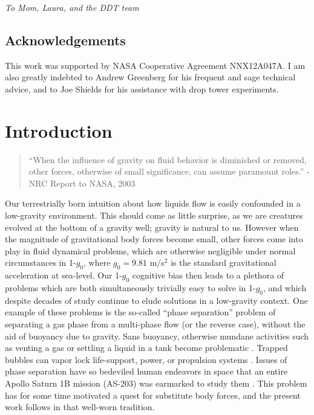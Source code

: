 \documentclass[12pt,a4paper,oneside]{book}
\newcommand\blankpage{%
    \null
    \thispagestyle{empty}%
    \addtocounter{page}{-1}%
    \newpage}
\begin{document}
\emph{To Mom, Laura, and the DDT team}\\
\vspace*{\fill}

\clearpage


\vspace*{\fill}
\section*{Acknowledgements}

This work was supported by NASA Cooperative Agreement NNX12A047A. I am also greatly indebted to Andrew Greenberg for his frequent and sage technical advice, and to Joe Shields for his assistance with drop tower experiments. \\ 
\vspace*{\fill}
\clearpage

\tableofcontents
\listoffigures

\mainmatter
\chapter{Introduction}
\begin{quote}
``When the influence of gravity on fluid behavior is diminished or removed, other forces, otherwise of small significance, can assume paramount roles.''
- NRC Report to NASA, 2003 \cite{motil_priorities_2012}
\end{quote}

Our terrestrially born intuition about how liquids flow is easily confounded in a low-gravity environment. This should come as little surprise, as we are creatures evolved at the bottom of a gravity well; gravity is natural to us. However when the magnitude of gravitational body forces become small, other forces come into play in fluid dynamical problems, which are otherwise negligible under normal circumstances in 1-$g_0$, where $g_0=9.81$ m/s$^2$ is the standard gravitational acceleration at sea-level. Our 1-$g_0$ cognitive bias then leads to a plethora of problems which are both simultaneously trivially easy to solve in 1-$g_0$, and which despite decades of study continue to elude solutions in a low-gravity context. One example of these problems is the so-called ``phase separation'' problem of separating a gas phase from a multi-phase flow (or the reverse case), without the aid of buoyancy due to gravity. Sans buoyancy, otherwise mundane activities such as venting a gas or settling a liquid in a tank become problematic \cite{petrash_controlling_1964}. Trapped bubbles can vapor lock life-support, power, or propulsion systems \cite{jenson_passive_2014}. Issues of phase separation have so bedeviled human endeavors in space that an entire Apollo Saturn 1B mission (AS-203) was earmarked to study them \cite{hastings_saturn_1965}. This problem has for some time motivated a quest for substitute body forces, and the present work follows in that well-worn tradition.
\end{document}

